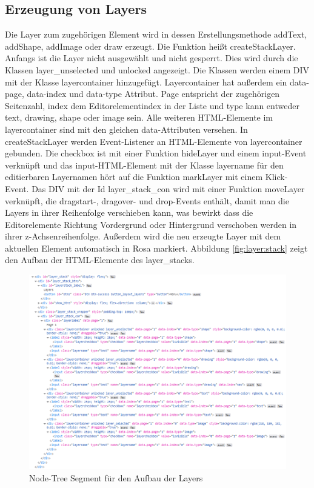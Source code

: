 \subsection{Erzeugung von Layers}
Die Layer zum zugehörigen Element wird in dessen Erstellungsmethode addText, addShape, addImage oder draw erzeugt. Die Funktion heißt createStackLayer. Anfangs ist die Layer nicht ausgewählt und nicht gesperrt. Dies wird durch die Klassen layer\_unselected und unlocked angezeigt. Die Klassen werden einem DIV mit der Klasse layercontainer hinzugefügt. Layercontainer hat außerdem ein data-page, data-index und data-type Attribut. Page entspricht der zugehörigen Seitenzahl, index dem Editorelementindex in der Liste und type kann entweder text, drawing, shape oder image sein. Alle weiteren HTML-Elemente im layercontainer sind mit den gleichen data-Attributen versehen. In createStackLayer werden Event-Listener an HTML-Elemente von layercontainer gebunden. Die checkbox ist mit einer Funktion hideLayer und einem input-Event verknüpft und das input-HTML-Element mit der Klasse layername für den editierbaren Layernamen hört auf die Funktion markLayer mit einem Klick-Event. Das DIV mit der Id layer\_stack\_con wird mit einer Funktion moveLayer verknüpft, die dragstart-, dragover- und drop-Events enthält, damit man die Layers in ihrer Reihenfolge verschieben kann, was bewirkt dass die Editorelemente Richtung Vordergrund oder Hintergrund verschoben werden in ihrer z-Achsenreihenfolge. Außerdem wird die neu erzeugte Layer mit dem aktuellen Element automatisch in Rosa markiert. Abbildung \ref{fig:layer:stack} zeigt den Aufbau der HTML-Elemente des layer\_stacks.

\begin{figure}[!htbp]
	\centering
	\includegraphics[width=1\textwidth]{"images/layer-stack.png"}
	\caption{Node-Tree Segment für den Aufbau der Layers}
	\label{fig:layer-stack}
\end{figure}

